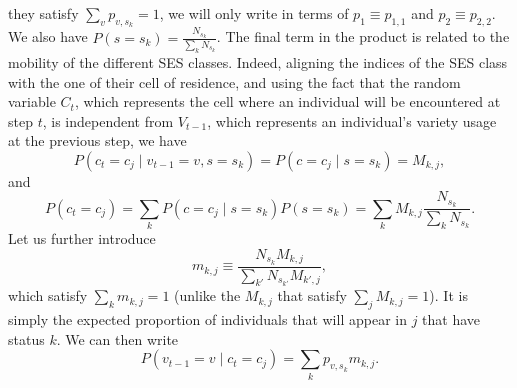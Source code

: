 \documentclass[../thesis.tex]{subfiles}
\begin{document}
they satisfy $\sum_v p_{v, s_k} = 1$, we will only write in terms of $p_1 \equiv p_{1,
1}$ and $p_2 \equiv p_{2, 2}$. We also have $P(s = s_k) = \frac{N_{s_k}}{\sum_k
N_{s_k}}$. The final term in the product is related to the mobility of the different SES
classes. Indeed, aligning the indices of the SES class with the one of their cell of
residence, and using the fact that the random variable $C_{t}$, which represents the
cell where an individual will be encountered at step $t$, is independent from $V_{t-1}$,
which represents an individual's variety usage at the previous step, we have
\begin{equation}
\label{eq:mob_by_SES}
    P(c_t = c_j \mid v_{t-1} = v, s = s_k) = P(c = c_j \mid s = s_k) = M_{k, j},
\end{equation}
and
\begin{equation}
    P(c_t = c_j) = \sum_k P(c = c_j \mid s = s_k) P(s = s_k) = \sum_k M_{k, j} \frac{N_{s_k}}{\sum_k
    N_{s_k}}.
\end{equation}
Let us further introduce
\begin{equation}
    m_{k, j} \equiv \frac{N_{s_k} M_{k, j}}{\sum_{k'} N_{s_{k'}} M_{k', j}},
\end{equation}
which satisfy $\sum_k m_{k, j} = 1$ (unlike the $M_{k, j}$ that satisfy $\sum_j M_{k, j}
= 1$). It is simply the expected proportion of individuals that will appear in $j$ that
have status $k$. We can then write
\begin{equation}
\label{eq:decomp_prev_by_SES}
    P(v_{t-1} = v \mid c_t = c_j) = \sum_k p_{v, s_k} m_{k, j}.
\end{equation}
\end{document}
